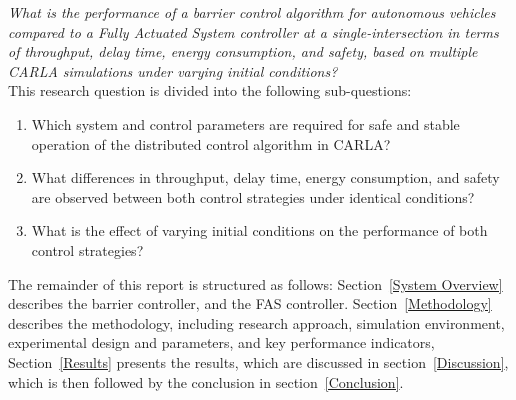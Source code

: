 \textit{What is the performance of a barrier control algorithm for autonomous vehicles compared to a Fully Actuated System controller at a single-intersection in terms of throughput, delay time, energy consumption, and safety, based on multiple CARLA simulations under varying initial conditions?}\\
This research question is divided into the following sub-questions:
\begin{enumerate}
    \item Which system and control parameters are required for safe and stable operation of the distributed control algorithm in CARLA?
    \item What differences in throughput, delay time, energy consumption, and safety are observed between both control strategies under identical conditions?
    \item What is the effect of varying initial conditions on the performance of both control strategies?
\end{enumerate}
The remainder of this report is structured as follows: Section~\ref{System Overview} describes the barrier controller, and the FAS controller. Section~\ref{Methodology} describes the methodology, including research approach, simulation environment, experimental design and parameters, and key performance indicators, Section~\ref{Results} presents the results, which are discussed in section~\ref{Discussion}, which is then followed by the conclusion in section~\ref{Conclusion}.  
